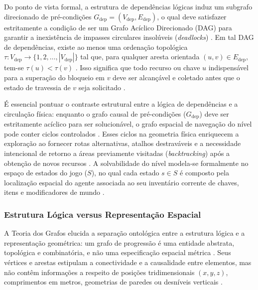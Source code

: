 Do ponto de vista formal, a estrutura de dependências lógicas induz um subgrafo direcionado de pré-condições $G_{\text{dep}} = (V_{\text{dep}}, E_{\text{dep}})$, o qual deve satisfazer estritamente a condição de ser um Grafo Acíclico Direcionado (DAG) para garantir a inexistência de impasses circulares insolúveis (\textit{deadlocks}) \cite{cormen2009introduction, xu2025databasedrivenframework3dlevel}. Em tal DAG de dependências, existe ao menos uma ordenação topológica $\tau: V_{\text{dep}} \to \{1, 2, \dots, |V_{\text{dep}}|\}$ tal que, para qualquer aresta orientada $(u, v) \in E_{\text{dep}}$, tem-se $\tau(u) < \tau(v)$ \cite{cormen2009introduction}. Isso significa que todo recurso ou chave $u$ indispensável para a superação do bloqueio em $v$ deve ser alcançável e coletado antes que o estado de travessia de $v$ seja solicitado \cite{xu2025databasedrivenframework3dlevel}.

É essencial pontuar o contraste estrutural entre a lógica de dependências e a circulação física: enquanto o grafo causal de pré-condições ($G_{\text{dep}}$) deve ser estritamente acíclico para ser solucionável, o grafo espacial de navegação do nível pode conter ciclos controlados \cite{dormans2010, linden2014dungeons}. Esses ciclos na geometria física enriquecem a exploração ao fornecer rotas alternativas, atalhos destraváveis e a necessidade intencional de retorno a áreas previamente visitadas (\textit{backtracking}) após a obtenção de novos recursos \cite{dormans2010, linden2013designing, linden2014dungeons}. A solvabilidade do nível modela-se formalmente no espaço de estados do jogo ($S$), no qual cada estado $s \in S$ é composto pela localização espacial do agente associada ao seu inventário corrente de chaves, itens e modificadores de mundo \cite{dormans2010, linden2014dungeons, xu2025databasedrivenframework3dlevel}.

\subsubsection{Estrutura Lógica versus Representação Espacial}
\label{sec:logica_vs_espacial}

A Teoria dos Grafos elucida a separação ontológica entre a estrutura lógica e a representação geométrica: um grafo de progressão é uma entidade abstrata, topológica e combinatória, e não uma especificação espacial métrica \cite{dormans2010, summerville2018procedural}. Seus vértices e arestas estipulam a conectividade e a causalidade entre elementos, mas não contêm informações a respeito de posições tridimensionais $(x, y, z)$, comprimentos em metros, geometrias de paredes ou desníveis verticais \cite{dormans2010, linden2013designing, linden2014dungeons}.

